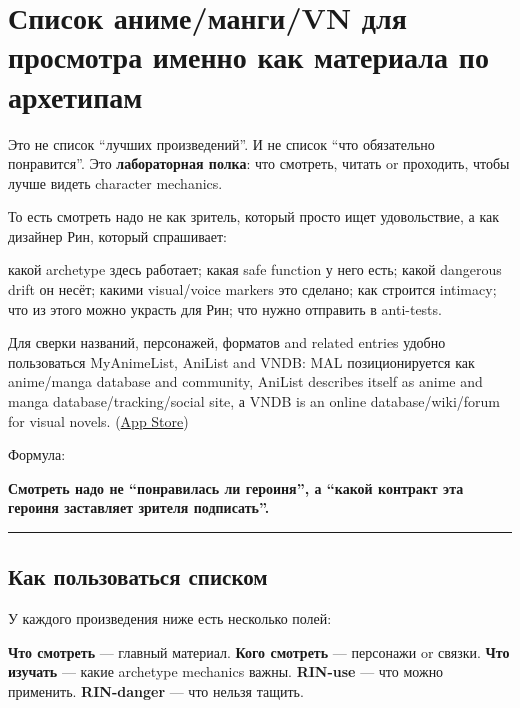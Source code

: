 \section{Список аниме/манги/VN для просмотра именно как материала по архетипам}

Это не список ``лучших произведений''. И не список ``что обязательно
понравится''. Это \textbf{лабораторная полка}: что смотреть, читать or
проходить, чтобы лучше видеть character mechanics.

То есть смотреть надо не как зритель, который просто ищет удовольствие,
а как дизайнер Рин, который спрашивает:

какой archetype здесь работает; какая safe function у него есть; какой
dangerous drift он несёт; какими visual/\hspace{0pt}voice markers это сделано; как
строится intimacy; что из этого можно украсть для Рин; что нужно
отправить в anti-tests.

Для сверки названий, персонажей, форматов and related entries удобно
пользоваться MyAnimeList, AniList and VNDB: MAL позиционируется как
anime/\hspace{0pt}manga database and community, AniList describes itself as anime
and manga database/\hspace{0pt}tracking/\hspace{0pt}social site, а VNDB is an online
database/\hspace{0pt}wiki/\hspace{0pt}forum for visual novels.
(\href{https://apps.apple.com/gb/app/myanimelist-official/id1469330778?utm_source=chatgpt.com}{App
Store})

Формула:

\textbf{Смотреть надо не ``понравилась ли героиня'', а ``какой контракт
эта героиня заставляет зрителя подписать''.}

\begin{center}\rule{0.5\linewidth}{0.5pt}\end{center}

\subsection*{Как пользоваться списком}

У каждого произведения ниже есть несколько полей:

\textbf{Что смотреть} --- главный материал. \textbf{Кого смотреть} ---
персонажи or связки. \textbf{Что изучать} --- какие archetype mechanics
важны. \textbf{RIN-use} --- что можно применить. \textbf{RIN-danger} ---
что нельзя тащить.

